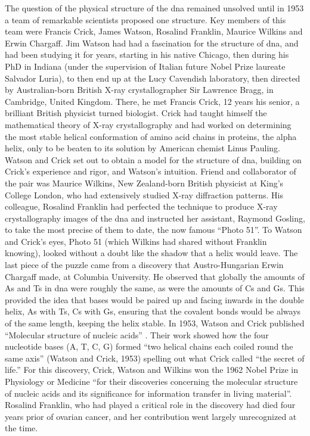 The question of the physical structure of the \gls{dna} remained unsolved until in 1953 a team of remarkable scientists proposed one structure. 
Key members of this team were Francis Crick, James Watson, Rosalind Franklin, Maurice Wilkins and Erwin Chargaff. 
Jim Watson had had a fascination for the structure of \gls{dna}, and had been studying it for years, starting in his native Chicago, then during his PhD in Indiana (under the supervision of Italian future Nobel Prize laureate Salvador Luria), to then end up at the Lucy Cavendish laboratory, then directed by Australian-born British X-ray crystallographer Sir Lawrence Bragg, in Cambridge, United Kingdom. 
There, he met Francis Crick, 12 years his senior, a brilliant British physicist turned biologist. 
Crick had taught himself the mathematical theory of X-ray crystallography and had worked on determining the most stable helical conformation of amino acid chains in proteins, the alpha helix, only to be beaten to its solution by American chemist Linus Pauling. 
Watson and Crick set out to obtain a model for the structure of \gls{dna}, building on Crick’s experience and rigor, and Watson’s intuition. 
Friend and collaborator of the pair was Maurice Wilkins, New Zealand-born British physicist at King’s College London, who had extensively studied X-ray diffraction patterns. 
His colleague, Rosalind Franklin had perfected the technique to produce X-ray crystallography images of the \gls{dna} and instructed her assistant, Raymond Gosling, to take the most precise of them to date, the now famous “Photo 51”. 
To Watson and Crick’s eyes, Photo 51 (which Wilkins had shared without Franklin knowing), looked without a doubt like the shadow that a helix would leave. The last piece of the puzzle came from a discovery that Austro-Hungarian Erwin Chargaff made, at Columbia University. He observed that globally the amounts of As and Ts in \gls{dna} were roughly the same, as were the amounts of Cs and Gs. 
This provided the idea that bases would be paired up and facing inwards in the double helix, As with Ts, Cs with Gs, ensuring that the covalent bonds would be always of the same length, keeping the helix stable. 
In 1953, Watson and Crick published “Molecular structure of nucleic acids” \cite{watson1953molecular}. 
Their work showed how the four nucleotide bases (A, T, C, G) formed “two helical chains each coiled round the same axis” (Watson and Crick, 1953) spelling out what Crick called “the secret of life.” 
For this discovery, Crick, Watson and Wilkins won the 1962 Nobel Prize in Physiology or Medicine “for their discoveries concerning the molecular structure of nucleic acids and its significance for information transfer in living material”. 
Rosalind Franklin, who had played a critical role in the discovery had died four years prior of ovarian cancer, and her contribution went largely unrecognized at the time.

